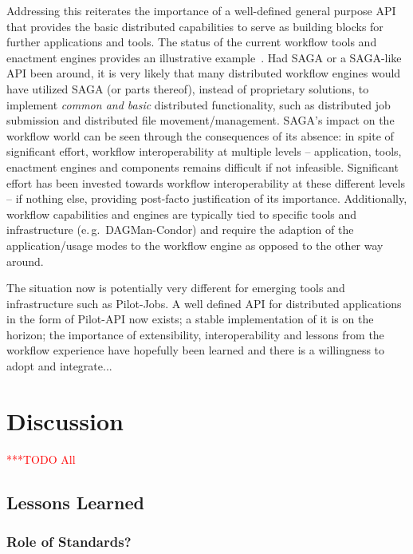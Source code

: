 \documentclass[a4paper,12pt]{article}
\newcommand{\todo}[1]{     {\textcolor{red}  { ***TODO      #1 }}}
\newcommand{\todo}[1]{}
\begin{document}
Addressing this reiterates the importance of a well-defined general
purpose API that provides the basic distributed capabilities to serve
as building blocks for further applications and tools. The status of
the current workflow tools and enactment engines provides an
illustrative example~\cite{nsf-workflow,1196459}. Had SAGA or a
SAGA-like API been around, it is very likely that many distributed
workflow engines would have utilized SAGA (or parts thereof), instead
of proprietary solutions, to implement {\it common and basic}
distributed functionality, such as distributed job submission and
distributed file movement/management. SAGA's impact on the workflow
world can be seen through the consequences of its absence: in spite of
significant effort, workflow interoperability at multiple levels --
application, tools, enactment engines and components remains difficult
if not infeasible.  Significant effort has been invested towards
workflow interoperability at these different levels -- if nothing
else, providing post-facto justification of its importance.
Additionally, workflow capabilities and engines are typically tied to
specific tools and infrastructure (e.\,g.\ DAGMan-Condor) and require
the adaption of the application/usage modes to the workflow engine as
opposed to the other way around.



The situation now is potentially very different for emerging tools and
infrastructure such as Pilot-Jobs. A well defined API for distributed
applications in the form of Pilot-API now exists; a stable
implementation of it is on the horizon; the importance of
extensibility, interoperability and lessons from the workflow
experience have hopefully been learned and there is a willingness to
adopt and integrate...

% 
\section{Discussion}\todo{All}

\subsection{Lessons Learned}

\subsubsection{Role of Standards?}
\end{document}
